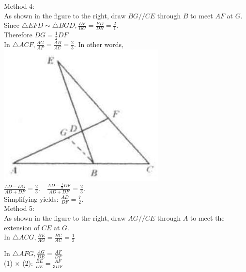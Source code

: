 \documentclass[10pt]{article}
\begin{document}
Method 4:\\
As shown in the figure to the right, draw \(B G / / C E\) through \(B\) to meet \(A F\) at \(G\).\\
Since \(\triangle E F D \sim \triangle B G D, \frac{D F}{D G}=\frac{E D}{D B}=\frac{2}{1}\).\\
Therefore \(D G=\frac{1}{2} D F\)\\
In \(\triangle A C F, \frac{A G}{A F}=\frac{A B}{A C}=\frac{2}{3}\). In other words,\\
\includegraphics[max width=\textwidth, center]{2025_04_17_97bc1f7e44d93c271a88g-112}\\
\(\frac{A D-D G}{A D+D F}=\frac{2}{3} . \quad \frac{A D-\frac{1}{2} D F}{A D+D F}=\frac{2}{3}\).\\
Simplifying yields: \(\frac{A D}{D F}=\frac{7}{2}\).\\
Method 5:\\
As shown in the figure to the right, draw \(A G / / C E\) through \(A\) to meet the extension of \(C E\) at \(G\).\\
In \(\triangle A C G, \frac{B E}{A G}=\frac{B C}{A C}=\frac{1}{3}\)


In \(\triangle A F G, \frac{A G}{D E}=\frac{A F}{D F}\)\\
(1) \(\times\) (2): \(\frac{B E}{D E}=\frac{A F}{3 D F}\)
\end{document}

